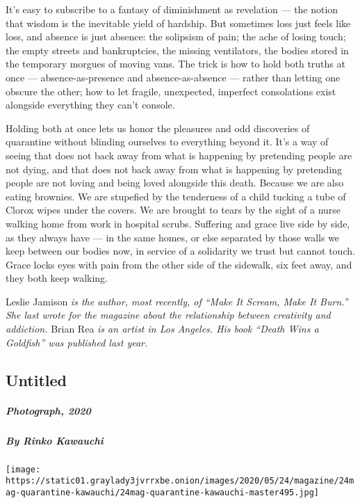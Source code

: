 It's easy to subscribe to a fantasy of diminishment as revelation ---
the notion that wisdom is the inevitable yield of hardship. But
sometimes loss just feels like loss, and absence is just absence: the
solipsism of pain; the ache of losing touch; the empty streets and
bankruptcies, the missing ventilators, the bodies stored in the
temporary morgues of moving vans. The trick is how to hold both truths
at once --- absence-as-presence and absence-as-absence --- rather than
letting one obscure the other; how to let fragile, unexpected, imperfect
consolations exist alongside everything they can't console.

Holding both at once lets us honor the pleasures and odd discoveries of
quarantine without blinding ourselves to everything beyond it. It's a
way of seeing that does not back away from what is happening by
pretending people are not dying, and that does not back away from what
is happening by pretending people are not loving and being loved
alongside this death. Because we are also eating brownies. We are
stupefied by the tenderness of a child tucking a tube of Clorox wipes
under the covers. We are brought to tears by the sight of a nurse
walking home from work in hospital scrubs. Suffering and grace live side
by side, as they always have --- in the same homes, or else separated by
those walls we keep between our bodies now, in service of a solidarity
we trust but cannot touch. Grace locks eyes with pain from the other
side of the sidewalk, six feet away, and they both keep walking.

Leslie Jamison \emph{is the author, most recently, of ``Make It Scream,
Make It Burn.'' She last wrote for the magazine about the relationship
between creativity and addiction.} Brian Rea \emph{is an artist in Los
Angeles. His book ``Death Wins a Goldfish'' was published last year.}

\hypertarget{untitled}{%
\subsection{Untitled}\label{untitled}}

\hypertarget{photograph-2020-2}{%
\subparagraph{Photograph, 2020}\label{photograph-2020-2}}

\hypertarget{by-rinko-kawauchi}{%
\subparagraph{By Rinko Kawauchi}\label{by-rinko-kawauchi}}

\texttt{[image: https://static01.graylady3jvrrxbe.onion/images/2020/05/24/magazine/24mag-quarantine-kawauchi/24mag-quarantine-kawauchi-master495.jpg]}

